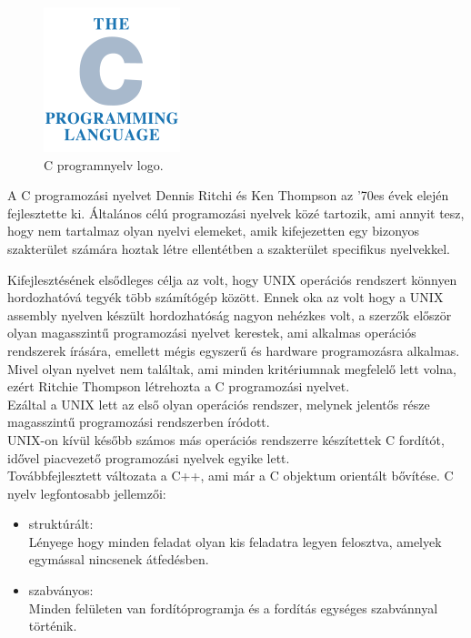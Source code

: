 \bigskip 
\begin{figure}[h]
\centering
\includegraphics[scale=0.6]{images/c_prog.png}
\caption{C programnyelv logo.}
\end{figure}
\bigskip 

A C programozási nyelvet Dennis Ritchi és Ken Thompson az '70es évek elején fejlesztette ki. Általános célú programozási nyelvek közé tartozik, ami annyit tesz, hogy nem tartalmaz olyan nyelvi elemeket, amik kifejezetten egy bizonyos szakterület számára hoztak létre ellentétben a szakterület specifikus nyelvekkel.

Kifejlesztésének elsődleges célja az volt, hogy  UNIX operációs rendszert könnyen hordozhatóvá tegyék több számítógép között.
Ennek oka az volt hogy a UNIX assembly nyelven készült hordozhatóság nagyon nehézkes volt, a szerzők először olyan magasszintű programozási nyelvet kerestek, ami alkalmas operációs rendszerek írására, emellett mégis egyszerű és hardware programozásra alkalmas. Mivel olyan nyelvet nem találtak, ami minden kritériumnak megfelelő lett volna, ezért Ritchie Thompson létrehozta a C programozási nyelvet.\cite{brian1978thec}\\

Ezáltal a UNIX lett az első olyan operációs rendszer, melynek jelentős része magasszintű programozási rendszerben íródott.\\

UNIX-on kívül később számos más operációs rendszerre készítettek C fordítót, idővel piacvezető programozási nyelvek egyike lett.\\

\noindent Továbbfejlesztett változata a C++, ami már a C objektum orientált bővítése.
\newpage
\noindent C nyelv legfontosabb jellemzői:
\begin{itemize}
\item struktúrált:\\
Lényege hogy minden feladat olyan kis feladatra legyen felosztva, amelyek egymással nincsenek átfedésben.
\item  szabványos:\\
Minden felületen van fordítóprogramja és a fordítás egységes szabvánnyal történik.
\end{itemize}

